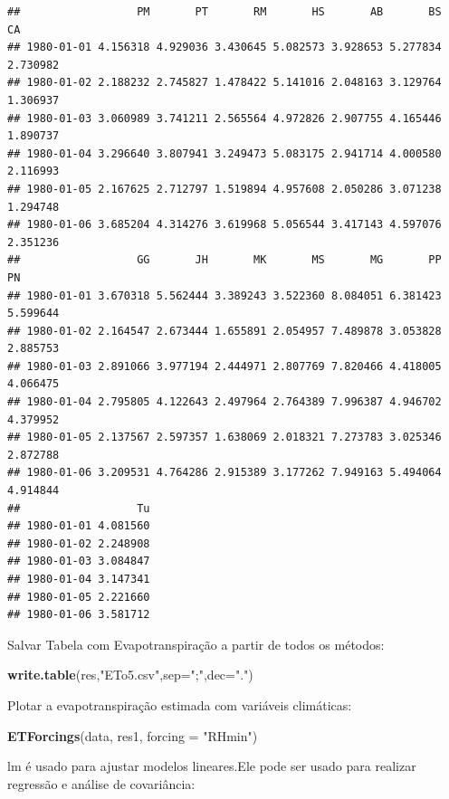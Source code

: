 \documentclass[
]{book}
\newenvironment{Shaded}{\begin{snugshade}}{\end{snugshade}}
\newcommand{\DataTypeTok}[1]{\textcolor[rgb]{0.13,0.29,0.53}{#1}}
\newcommand{\DecValTok}[1]{\textcolor[rgb]{0.00,0.00,0.81}{#1}}
\newcommand{\KeywordTok}[1]{\textcolor[rgb]{0.13,0.29,0.53}{\textbf{#1}}}
\newcommand{\NormalTok}[1]{#1}
\newcommand{\OperatorTok}[1]{\textcolor[rgb]{0.81,0.36,0.00}{\textbf{#1}}}
\newcommand{\StringTok}[1]{\textcolor[rgb]{0.31,0.60,0.02}{#1}}
\begin{document}
\begin{verbatim}
##                  PM       PT       RM       HS       AB       BS       CA
## 1980-01-01 4.156318 4.929036 3.430645 5.082573 3.928653 5.277834 2.730982
## 1980-01-02 2.188232 2.745827 1.478422 5.141016 2.048163 3.129764 1.306937
## 1980-01-03 3.060989 3.741211 2.565564 4.972826 2.907755 4.165446 1.890737
## 1980-01-04 3.296640 3.807941 3.249473 5.083175 2.941714 4.000580 2.116993
## 1980-01-05 2.167625 2.712797 1.519894 4.957608 2.050286 3.071238 1.294748
## 1980-01-06 3.685204 4.314276 3.619968 5.056544 3.417143 4.597076 2.351236
##                  GG       JH       MK       MS       MG       PP       PN
## 1980-01-01 3.670318 5.562444 3.389243 3.522360 8.084051 6.381423 5.599644
## 1980-01-02 2.164547 2.673444 1.655891 2.054957 7.489878 3.053828 2.885753
## 1980-01-03 2.891066 3.977194 2.444971 2.807769 7.820466 4.418005 4.066475
## 1980-01-04 2.795805 4.122643 2.497964 2.764389 7.996387 4.946702 4.379952
## 1980-01-05 2.137567 2.597357 1.638069 2.018321 7.273783 3.025346 2.872788
## 1980-01-06 3.209531 4.764286 2.915389 3.177262 7.949163 5.494064 4.914844
##                  Tu
## 1980-01-01 4.081560
## 1980-01-02 2.248908
## 1980-01-03 3.084847
## 1980-01-04 3.147341
## 1980-01-05 2.221660
## 1980-01-06 3.581712
\end{verbatim}

Salvar Tabela com Evapotranspiração a partir de todos os métodos:

\begin{Shaded}
\begin{Highlighting}[]
\KeywordTok{write.table}\NormalTok{(res,}\StringTok{"ETo5.csv"}\NormalTok{,}\DataTypeTok{sep=}\StringTok{";"}\NormalTok{,}\DataTypeTok{dec=}\StringTok{"."}\NormalTok{)}
\end{Highlighting}
\end{Shaded}

Plotar a evapotranspiração estimada com variáveis climáticas:

\begin{Shaded}
\begin{Highlighting}[]
\KeywordTok{ETForcings}\NormalTok{(data, res1, }\DataTypeTok{forcing =} \StringTok{"RHmin"}\NormalTok{)}
\end{Highlighting}
\end{Shaded}

lm é usado para ajustar modelos lineares.Ele pode ser usado para realizar regressão e análise de covariância:

\begin{Shaded}
\end{Shaded}
\end{document}
